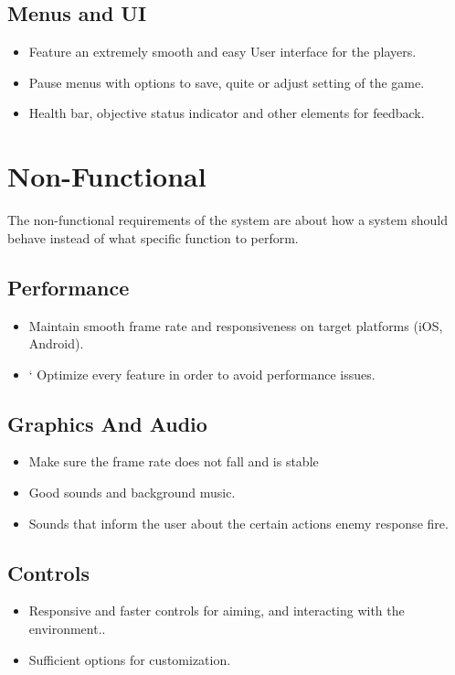 \subsection{Menus and UI}
\begin{itemize}
	\item	Feature an extremely smooth and easy User interface for the players.
	\item 	Pause menus with options to save, quite or adjust setting of the game.
	\item 	Health bar, objective status indicator and other elements for feedback.
\end{itemize}

\section{Non-Functional}
The non-functional requirements of the system are about how a system should behave instead of what specific function to perform.
\subsection{Performance}
\begin{itemize}
	\item 	Maintain smooth frame rate and responsiveness on target platforms (iOS, Android).
	\item`	Optimize every feature in order to avoid performance issues.
\end{itemize}
\subsection{Graphics And Audio}
\begin{itemize}
	\item   Make sure the frame rate does not fall and is stable \cite {singh2023effect}
	\item 	Good sounds and background music.
	\item 	Sounds that inform the user about the certain actions enemy response fire.
\end{itemize}
\subsection{Controls}
\begin{itemize}
	\item 	Responsive and faster controls for aiming, and interacting with the environment..
	\item 	Sufficient options for customization.
\end{itemize}
